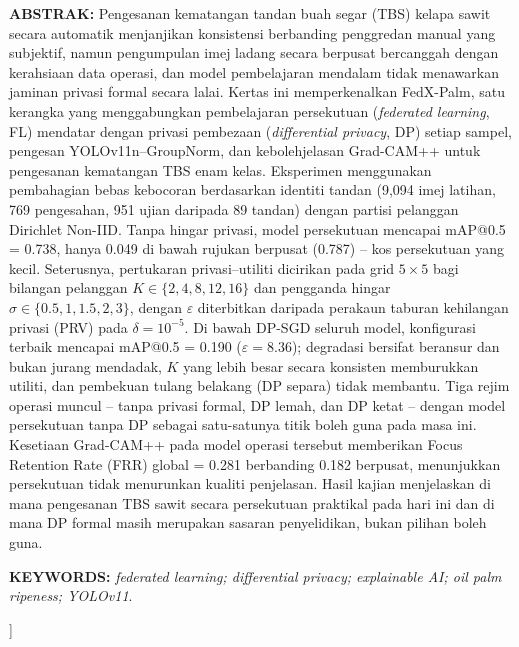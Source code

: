 \documentclass[twocolumn,a4paper,10pt]{article}
\begin{document}
\begin{@twocolumnfalse}
\vspace{0.4em}
\noindent\textbf{ABSTRAK:} Pengesanan kematangan tandan buah segar (TBS) kelapa
sawit secara automatik menjanjikan konsistensi berbanding penggredan manual yang
subjektif, namun pengumpulan imej ladang secara berpusat bercanggah dengan
kerahsiaan data operasi, dan model pembelajaran mendalam tidak menawarkan
jaminan privasi formal secara lalai. Kertas ini memperkenalkan FedX-Palm, satu
kerangka yang menggabungkan pembelajaran persekutuan (\emph{federated learning},
FL) mendatar dengan privasi pembezaan (\emph{differential privacy}, DP) setiap
sampel, pengesan YOLOv11n--GroupNorm, dan kebolehjelasan Grad-CAM++ untuk
pengesanan kematangan TBS enam kelas. Eksperimen menggunakan pembahagian bebas
kebocoran berdasarkan identiti tandan (9,094 imej latihan, 769 pengesahan, 951
ujian daripada 89 tandan) dengan partisi pelanggan Dirichlet Non-IID. Tanpa
hingar privasi, model persekutuan mencapai mAP@0.5 = 0.738, hanya 0.049 di bawah
rujukan berpusat (0.787) -- kos persekutuan yang kecil. Seterusnya, pertukaran
privasi--utiliti dicirikan pada grid $5 \times 5$ bagi bilangan pelanggan $K \in
\{2,4,8,12,16\}$ dan pengganda hingar $\sigma \in \{0.5,1,1.5,2,3\}$, dengan
$\varepsilon$ diterbitkan daripada perakaun taburan kehilangan privasi (PRV)
pada $\delta = 10^{-5}$. Di bawah DP-SGD seluruh model, konfigurasi terbaik
mencapai mAP@0.5 = 0.190 ($\varepsilon = 8.36$); degradasi bersifat beransur dan
bukan jurang mendadak, $K$ yang lebih besar secara konsisten memburukkan
utiliti, dan pembekuan tulang belakang (DP separa) tidak membantu. Tiga rejim
operasi muncul -- tanpa privasi formal, DP lemah, dan DP ketat -- dengan model
persekutuan tanpa DP sebagai satu-satunya titik boleh guna pada masa ini.
Kesetiaan Grad-CAM++ pada model operasi tersebut memberikan Focus Retention
Rate (FRR) global = 0.281 berbanding 0.182 berpusat, menunjukkan persekutuan
tidak menurunkan kualiti penjelasan. Hasil kajian menjelaskan di mana
pengesanan TBS sawit secara persekutuan praktikal pada hari ini dan di mana DP
formal masih merupakan sasaran penyelidikan, bukan pilihan boleh guna.

\vspace{0.4em}
\noindent\textbf{KEYWORDS:} \emph{federated learning; differential privacy;
explainable AI; oil palm ripeness; YOLOv11}.

\vspace{1.2em}
\end{@twocolumnfalse}
]
\end{document}
